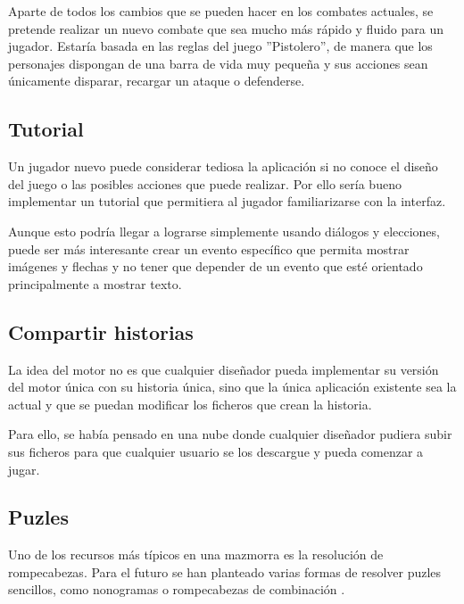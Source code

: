 Aparte de todos los cambios que se pueden hacer en los combates actuales, se pretende realizar un nuevo combate que sea mucho más rápido y fluido para un jugador. Estaría basada en las reglas del juego ''Pistolero'', de manera que los personajes dispongan de una barra de vida muy pequeña y sus acciones sean únicamente disparar, recargar un ataque o defenderse.

\subsection{Tutorial}
Un jugador nuevo puede considerar tediosa la aplicación si no conoce el diseño del juego o las posibles acciones que puede realizar. Por ello sería bueno implementar un tutorial que permitiera al jugador familiarizarse con la interfaz.

Aunque esto podría llegar a lograrse simplemente usando diálogos y elecciones, puede ser más interesante crear un evento específico que permita mostrar imágenes y flechas y no tener que depender de un evento que esté orientado principalmente a mostrar texto.
 
\subsection{Compartir historias}
La idea del motor no es que cualquier diseñador pueda implementar su versión del motor única con su historia única, sino que la única aplicación existente sea la actual y que se puedan modificar los ficheros que crean la historia.

Para ello, se había pensado en una nube donde cualquier diseñador pudiera subir sus ficheros para que cualquier usuario se los descargue y pueda comenzar a jugar.

\subsection{Puzles}
Uno de los recursos más típicos en una mazmorra es la resolución de rompecabezas. Para el futuro se han planteado varias formas de resolver puzles sencillos, como nonogramas \cite{nonograms} o rompecabezas de combinación \cite{combinationPuzzles}.

